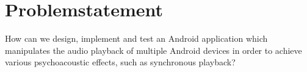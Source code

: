 \chapter{Problemstatement}


\begin{problemstatement}
    How can we design, implement and test an Android application which manipulates the audio playback of multiple Android devices in order to achieve various psychoacoustic effects, such as synchronous playback?
\end{problemstatement}
